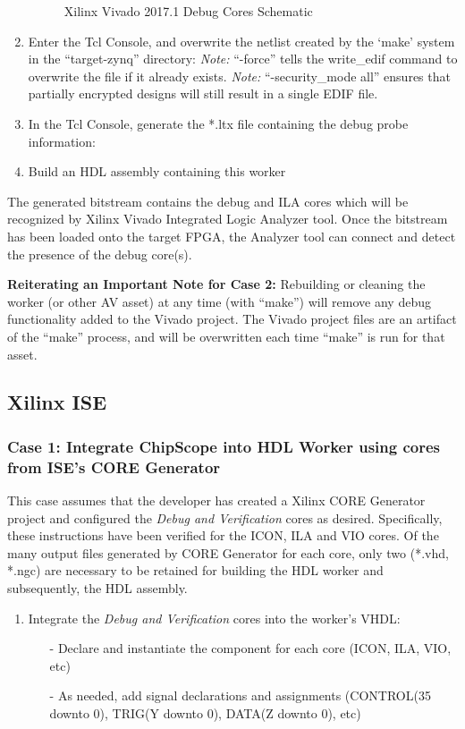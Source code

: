 \begin{flushleft}
\begin{enumerate}
\begin{figure}[H]
					\caption{Xilinx Vivado 2017.1 Debug Cores Schematic}
			\end{figure}
		\item Enter the Tcl Console, and overwrite the netlist created by the `make' system in the ``target-zynq'' directory:
			\subitem {}
			\subitem \textit{Note:} ``-force'' tells the write\_edif command to overwrite the file if it already exists.
			\subitem \textit{Note:} ``-security\_mode all'' ensures that partially encrypted designs will still result in a single EDIF file.
		\item In the Tcl Console, generate the *.ltx file containing the debug probe information:
			\subitem {}
		\item Build an HDL assembly containing this worker
	\end{enumerate}
The generated bitstream contains the debug and ILA cores which will be recognized by Xilinx Vivado Integrated Logic Analyzer tool. Once the bitstream has been loaded onto the target FPGA, the Analyzer tool can connect and detect the presence of the debug core(s).\newline

\textbf{Reiterating an Important Note for Case 2:} Rebuilding or cleaning the worker (or other AV asset) at any time (with ``make'') will remove any debug functionality added to the Vivado project. The Vivado project files are an artifact of the ``make'' process, and will be overwritten each time ``make'' is run for that asset.


\subsection{Xilinx ISE}
	\subsubsection{Case 1: Integrate ChipScope into HDL Worker using cores from ISE's CORE Generator}
\label{ise1}
		This case assumes that the developer has created a Xilinx CORE Generator project and configured the \textit{Debug and Verification} cores as desired. Specifically, these instructions have been verified for the ICON, ILA and VIO cores. Of the many output files generated by CORE Generator for each core, only two (*.vhd, *.ngc) are necessary to be retained for building the HDL worker and subsequently, the HDL assembly.

		\begin{enumerate}
			\item Integrate the \textit{Debug and Verification} cores into the worker's VHDL:
			\begin{itemize}
			\item[-] Declare and instantiate the component for each core (ICON, ILA, VIO, etc)
				\item[-] As needed, add signal declarations and assignments (CONTROL(35 downto 0), TRIG(Y downto 0), DATA(Z downto 0), etc)
			\end{itemize}
				

\end{enumerate}
\end{flushleft}
